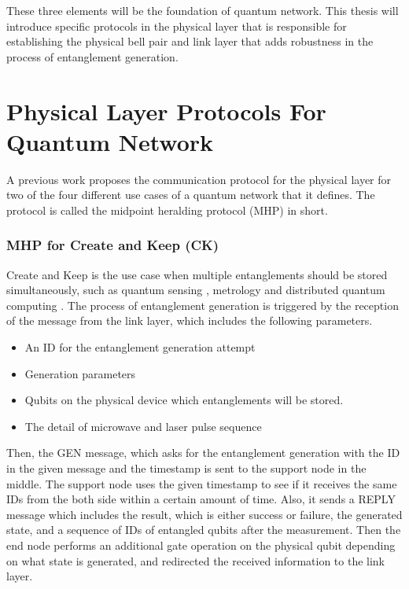 These three elements will be the foundation of quantum network. This thesis will introduce specific protocols in the physical layer that is responsible for establishing the physical bell pair and link layer that adds robustness in the process of entanglement generation.

\section{Physical Layer Protocols For Quantum Network}

A previous work \cite{Dahlberg_2019} proposes the communication protocol for the physical layer for two of the four different use cases of a quantum network that it defines.
The protocol is called the midpoint heralding protocol (MHP) in short.

\subsubsection{MHP for Create and Keep (CK)}

Create and Keep is the use case when multiple entanglements should be stored simultaneously, such as quantum sensing \cite{PhysRevLett.109.070503}, metrology \cite{komar2014quantum} and distributed quantum computing \cite{10.1145/1060590.1060662}.
The process of entanglement generation is triggered by the reception of the message from the link layer, which includes the following parameters.
\begin{itemize}
  \item An ID for the entanglement generation attempt
  \item Generation parameters
  \item Qubits on the physical device which entanglements will be stored.
  \item The detail of microwave and laser pulse sequence
\end{itemize}

Then, the GEN message, which asks for the entanglement generation with the ID in the given message and the timestamp is sent to the support node in the middle. 
The support node uses the given timestamp to see if it receives the same IDs from the both side within a certain amount of time.
Also, it sends a REPLY message which includes the result, which is either success or failure, the generated state, and a sequence of IDs of entangled qubits after the measurement.
Then the end node performs an additional gate operation on the physical qubit depending on what state is generated, and redirected the received information to the link layer.


